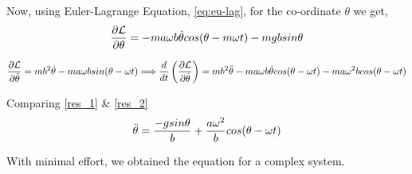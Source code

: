 \documentclass[a4paper]{article}
\begin{document}
 Now, using Euler-Lagrange Equation, \ref{eq:eu-lag}, for the co-ordinate $\theta$ we get, 
\begin{equation}
{\partial{\mathcal{L}}\over\partial \theta} = -ma\omega b {\dot \theta} cos(\theta - m\omega t) - mgb sin\theta \label{res_1}
\end{equation}

\begin{equation}
\scriptsize{\partial{\mathcal{L}}\over\partial \dot \theta} = mb^2\dot \theta -ma\omega b sin (\theta -\omega t ) \Longrightarrow {d\over dt}\left(\partial{\mathcal{L}}\over\partial \dot \theta\right) = mb^2\ddot \theta - ma\omega b\dot \theta cos (\theta - \omega t) - ma\omega^2 b cos(\theta -\omega t)  \label{res_2}
\end{equation}

Comparing \ref{res_1} \& \ref{res_2}
\begin{equation}
    \ddot \theta = {-gsin\theta\over b} +{a\omega^2\over b}cos(\theta - \omega t)
\end{equation}

With minimal effort, we obtained the equation for a complex system.



\end{document}
